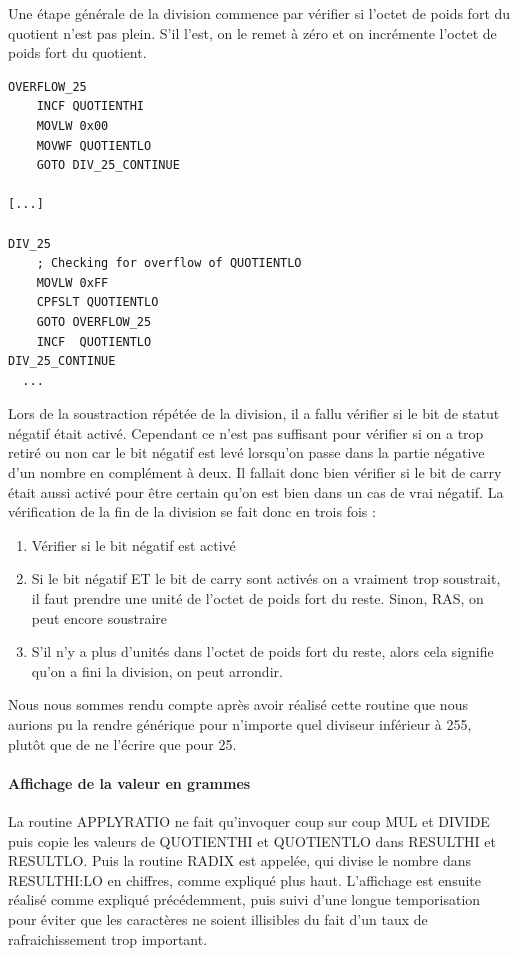 \documentclass[a4paper,11pt,titlepage]{article}
\begin{document}
Une étape générale de la division commence par vérifier si l'octet de poids fort du quotient n'est pas plein. S'il l'est, on le remet à zéro et on incrémente l'octet de poids fort du quotient.

\begin{lstlisting}
OVERFLOW_25
    INCF QUOTIENTHI
    MOVLW 0x00
    MOVWF QUOTIENTLO
    GOTO DIV_25_CONTINUE

[...]

DIV_25
    ; Checking for overflow of QUOTIENTLO
    MOVLW 0xFF
    CPFSLT QUOTIENTLO
    GOTO OVERFLOW_25
    INCF  QUOTIENTLO	
DIV_25_CONTINUE
  ...
\end{lstlisting}


Lors de la soustraction répétée de la division, il a fallu vérifier si le bit de statut négatif était activé. Cependant ce n'est pas suffisant pour vérifier si on a trop retiré ou non car le bit négatif est levé lorsqu'on passe dans la partie négative d'un nombre en complément à deux. Il fallait donc bien vérifier si le bit de carry était aussi activé pour être certain qu'on est bien dans un cas de vrai négatif.
La vérification de la fin de la division se fait donc en trois fois :

\begin{enumerate}
  \item Vérifier si le bit négatif est activé
  \item Si le bit négatif ET le bit de carry sont activés on a vraiment trop soustrait, il faut prendre une unité de l'octet de poids fort du reste. Sinon, RAS, on peut encore soustraire
  \item S'il n'y a plus d'unités dans l'octet de poids fort du reste, alors cela signifie qu'on a fini la division, on peut arrondir.
\end{enumerate}

Nous nous sommes rendu compte après avoir réalisé cette routine que nous aurions pu la rendre générique pour n'importe quel diviseur inférieur à 255, plutôt que de ne l'écrire que pour 25.

\paragraph{Affichage de la valeur en grammes}

La routine APPLY\textunderscore RATIO ne fait qu'invoquer coup sur coup MUL et DIVIDE puis copie les valeurs de QUOTIENTHI et QUOTIENTLO dans RESULTHI et RESULTLO. Puis la routine RADIX est appelée, qui divise le nombre dans RESULTHI:LO en chiffres, comme expliqué plus haut. L'affichage est ensuite réalisé comme expliqué précédemment, puis suivi d'une longue temporisation pour éviter que les caractères ne soient illisibles du fait d'un taux de rafraichissement trop important.
\end{document}
